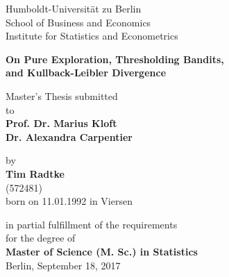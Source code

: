 \documentclass[11pt,]{article}
\title{}
\author{}
\date{}
\begin{document}

\begin{centering}

\vspace{5cm}


    {\Large Humboldt-Universit\"at zu Berlin \\
    School of Business and Economics \\
    Institute for Statistics and Econometrics\\} 
    
    \vspace{4cm}

{\huge{\bf On Pure Exploration, Thresholding Bandits, \\
and Kullback-Leibler Divergence\\}} 

\vspace{2cm}


{\large Master's Thesis submitted\\\vspace{0.5cm}
    to}
    \\\vspace{0.5cm}
    {\large{\bf Prof. Dr. Marius Kloft \\}}
    {\large{\bf Dr. Alexandra Carpentier \\}}
    \vspace{0.5cm}


    {\large by \\\vspace{0.5cm}
    {\bf Tim Radtke\\}
    (572481)\\
    born on 11.01.1992 in Viersen \\\vspace{1cm}}
    


    {\large in partial fulfillment of the requirements \\
    for the degree of \\
    {\bf Master of Science (M. Sc.) in Statistics\\} \vspace{3cm}
    Berlin, September 18, 2017\\}

\end{centering}

\newpage

\vspace*{10\baselineskip}
\end{document}
